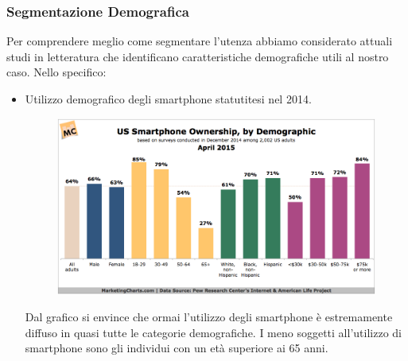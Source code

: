 \subsubsection{Segmentazione Demografica}
Per comprendere meglio come segmentare l'utenza abbiamo considerato
attuali studi in letteratura che identificano caratteristiche
demografiche utili al nostro caso.
Nello specifico:
\begin{itemize}
\item Utilizzo demografico degli smartphone statutitesi nel 2014.
\begin{figure} [H]
	\centering
	\includegraphics[scale=0.3]{img/demographic-smartphone.png}
\end{figure}
Dal grafico si envince che ormai l'utilizzo degli smartphone è
estremamente diffuso in quasi tutte le categorie demografiche.
I meno soggetti all'utilizzo di smartphone sono gli individui con un età
superiore ai 65 anni.


\end{itemize}
